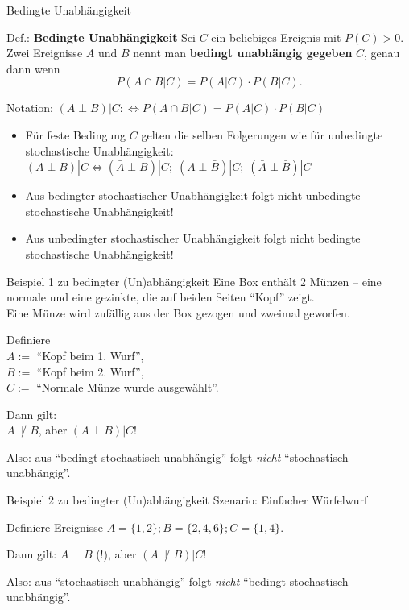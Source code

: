 \documentclass[
  10pt,
  ignorenonframetext,
]{beamer}
\providecommand{\tightlist}{%
  \setlength{\itemsep}{0pt}\setlength{\parskip}{0pt}}
\begin{document}
\begin{frame}{Bedingte Unabhängigkeit}
\label{bedingte-unabhuxe4ngigkeit}
\begin{block}{Def.: \textbf{Bedingte Unabhängigkeit}}
\label{def.-bedingte-unabhuxe4ngigkeit}
Sei \(C\) ein beliebiges Ereignis mit \(P(C)>0\). Zwei Ereignisse \(A\)
und \(B\) nennt man \textbf{bedingt unabhängig gegeben} \(C\), genau
dann wenn \[
P(A \cap B|C) = P(A|C) \cdot P(B|C).
\]
\end{block}

Notation: \((A \perp B)|C :\iff P(A \cap B|C) = P(A|C) \cdot P(B|C)\)

\begin{itemize}
\tightlist
\item
  Für feste Bedingung \(C\) gelten die selben Folgerungen wie für
  unbedingte stochastische Unabhängigkeit:\\
  \((A \perp B)|C \iff (\bar{A} \perp B)|C;\; (A \perp \bar B)|C;\; (\bar A \perp \bar B)|C\)
\item
  Aus bedingter stochastischer Unabhängigkeit folgt nicht unbedingte
  stochastische Unabhängigkeit!
\item
  Aus unbedingter stochastischer Unabhängigkeit folgt nicht bedingte
  stochastische Unabhängigkeit!
\end{itemize}
\end{frame}

\begin{frame}{Beispiel 1 zu bedingter (Un)abhängigkeit}
\label{beispiel-1-zu-bedingter-unabhuxe4ngigkeit}
Eine Box enthält 2 Münzen -- eine normale und eine gezinkte, die auf
beiden Seiten ``Kopf'' zeigt.\\
Eine Münze wird zufällig aus der Box gezogen und zweimal geworfen.

Definiere\\
\(A :=\) ``Kopf beim 1. Wurf'',\\
\(B :=\) ``Kopf beim 2. Wurf'',\\
\(C:=\) ``Normale Münze wurde ausgewählt''.

Dann gilt:\\
\(A \not \perp B\), aber \((A \perp B)|C\)!

Also: aus ``bedingt stochastisch unabhängig'' folgt \emph{nicht}
``stochastisch unabhängig''.
\end{frame}

\begin{frame}{Beispiel 2 zu bedingter (Un)abhängigkeit}
\label{beispiel-2-zu-bedingter-unabhuxe4ngigkeit}
Szenario: Einfacher Würfelwurf

Definiere Ereignisse \(A = \{1, 2\}; B = \{2, 4, 6\}; C = \{1, 4\}\).

Dann gilt: \(A \perp B\) (!), aber \((A \not \perp B)|C\)!

Also: aus ``stochastisch unabhängig'' folgt \emph{nicht} ``bedingt
stochastisch unabhängig''.
\end{frame}
\end{document}
